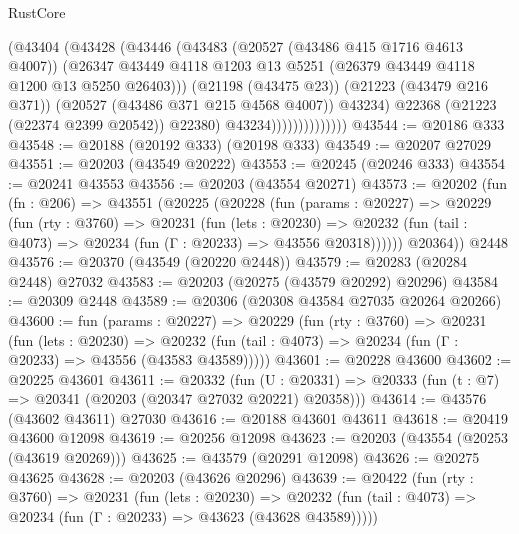 \begin{lexlean}{RustCore}
\begin{coremodule}
                              (@43404
                                (@43428
                                  (@43446
                                    (@43483
                                      (@20527 (@43486 @415 @1716 @4613 @4007))
                                      (@26347
                                        @43449
                                        @4118
                                        @1203
                                        @13
                                        @5251
                                        (@26379 @43449 @4118 @1200 @13 @5250 @26403)))
                                    (@21198 (@43475 @23))
                                    (@21223 (@43479 @216 @371))
                                    (@20527 (@43486 @371 @215 @4568 @4007))
                                    @43234)
                                  @22368
                                  (@21223 (@22374 @2399 @20542))
                                  @22380)
                                @43234))))))))))))))
@43544 := @20186 @333
@43548 := @20188 (@20192 @333) (@20198 @333)
@43549 := @20207 @27029
@43551 := @20203 (@43549 @20222)
@43553 := @20245 (@20246 @333)
@43554 := @20241 @43553
@43556 := @20203 (@43554 @20271)
@43573 := @20202
    (fun (fn : @206) =>
    @43551
      (@20225
        (@20228
          (fun (params : @20227) =>
          @20229
            (fun (rty : @3760) =>
            @20231
              (fun (lets : @20230) =>
              @20232 (fun (tail : @4073) => @20234 (fun (Γ : @20233) => @43556 @20318))))))
        @20364))
    @2448
@43576 := @20370 (@43549 (@20220 @2448))
@43579 := @20283 (@20284 @2448) @27032
@43583 := @20203 (@20275 (@43579 @20292) @20296)
@43584 := @20309 @2448
@43589 := @20306 (@20308 @43584 @27035 @20264 @20266)
@43600 := fun (params : @20227) =>
  @20229
    (fun (rty : @3760) =>
    @20231
      (fun (lets : @20230) =>
      @20232 (fun (tail : @4073) => @20234 (fun (Γ : @20233) => @43556 (@43583 @43589)))))
@43601 := @20228 @43600
@43602 := @20225 @43601
@43611 := @20332
    (fun (U : @20331) => @20333 (fun (t : @7) => @20341 (@20203 (@20347 @27032 @20221) @20358)))
@43614 := @43576 (@43602 @43611) @27030
@43616 := @20188 @43601 @43611
@43618 := @20419 @43600 @12098
@43619 := @20256 @12098
@43623 := @20203 (@43554 (@20253 (@43619 @20269)))
@43625 := @43579 (@20291 @12098)
@43626 := @20275 @43625
@43628 := @20203 (@43626 @20296)
@43639 := @20422
    (fun (rty : @3760) =>
    @20231
      (fun (lets : @20230) =>
      @20232 (fun (tail : @4073) => @20234 (fun (Γ : @20233) => @43623 (@43628 @43589)))))

\end{coremodule}
\end{lexlean}
